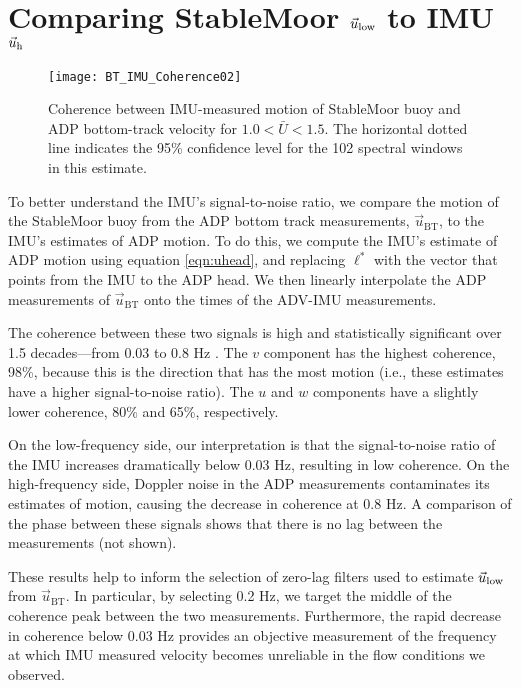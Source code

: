 \section{Comparing StableMoor $\vec{u}_\mathrm{low}$ to IMU $\vec{u}_\mathrm{h}$}
\label{apdx:ulow}

\def\ubt{\ensuremath{\vec{u}_\mathrm{BT}}}

\begin{figure}[t]
  \centering
  \texttt{[image: BT\_IMU\_Coherence02]}
  \caption{Coherence between IMU-measured motion of StableMoor buoy and ADP bottom-track velocity for $1.0<\bar{U}<1.5$. The horizontal dotted line indicates the 95\% confidence level for the 102 spectral windows in this estimate.}
  \label{fig:SM_coh}
\end{figure}
To better understand the IMU's signal-to-noise ratio, we compare the motion of the StableMoor buoy from the ADP bottom track measurements, $\ubt$, to the IMU's estimates of ADP motion. To do this, we compute the IMU's estimate of ADP motion using equation \eqref{eqn:uhead}, and replacing $\ell^{*}$ with the vector that points from the IMU to the ADP head. We then linearly interpolate the ADP measurements of $\ubt$ onto the times of the ADV-IMU measurements.

The coherence between these two signals is high and statistically significant over 1.5 decades---from 0.03 to 0.8 Hz \cite[][]{Priestley1981}. The $v$ component has the highest coherence, 98\%, because this is the direction that has the most motion (i.e., these estimates have a higher signal-to-noise ratio).  The $u$ and $w$ components have a slightly lower coherence, 80\% and 65\%, respectively.

On the low-frequency side, our interpretation is that the signal-to-noise ratio of the IMU increases dramatically below 0.03 Hz, resulting in low coherence. On the high-frequency side, Doppler noise in the ADP measurements contaminates its estimates of motion, causing the decrease in coherence at 0.8 Hz. A comparison of the phase between these signals shows that there is no lag between the measurements (not shown).


These results help to inform the selection of zero-lag filters used to estimate $\vec{u}_\mathrm{low}$ from $\ubt$. In particular, by selecting 0.2 Hz, we target the middle of the coherence peak between the two measurements. Furthermore, the rapid decrease in coherence below 0.03 Hz provides an objective measurement of the frequency at which IMU measured velocity becomes unreliable in the flow conditions we observed. 



